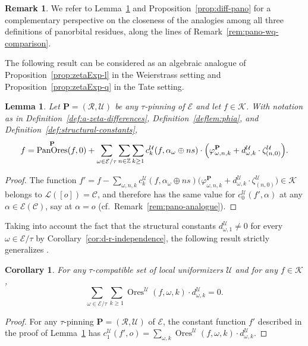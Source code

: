 \documentclass[preprint,12pt]{elsarticle}
\numberwithin{equation}{section} %
\theoremstyle{theorem}
\newtheorem{lemma}[theorem]{Lemma}
\newtheorem{corollary}[theorem]{Corollary}
\theoremstyle{definition}
\newtheorem{remark}[theorem]{Remark}
\newcommand{\Ca}{\mathcal{C}} %
\newcommand{\bk}{\mathcal{K}} %
\newcommand{\ec}{\mathcal{E}} %
\newcommand{\idec}{{o}} %
\newcommand{\orbita}{{\ec/\tau}} %
\newcommand{\Z}{\mathbb{Z}} %
\newcommand{\za}[2]{\zeta^{\mathcal{U}}_{( {#1} , {#2} )}}
\DeclareMathOperator{\ores}{Ores}
\DeclareMathOperator{\pano}{PanOres}
\begin{document}
\begin{remark}
    We refer to Lemma~\ref{lem:zetaExp-a} and Proposition~\ref{prop:diff-pano} for a complementary perspective on the closeness of the analogies among all three definitions of panorbital residues, along the lines of Remark~\ref{rem:pano-wq-comparison}.
\end{remark}


The following result can be considered as an algebraic analogue of Proposition~\ref{prop:zetaExp-l} in the Weierstrass setting and Proposition~\ref{prop:zetaExp-q} in the Tate setting.

\begin{lemma}\label{lem:zetaExp-a}
    Let $\mathbf{P}=(\mathcal{R},\mathcal{U})$ be any $\tau$-pinning of $\mathcal{E}$ and let $f\in\bk$. With notation as in Definition~\ref{def:a-zeta-differences},  Definition~\ref{deflem:phia}, and Definition~\ref{def:structural-constants},
    \begin{equation}\label{eq:zetaExp-a}
    f=\pano^\mathbf{P}(f,0)+\sum_{\omega\in\orbita}\sum_{n\in\Z}\sum_{k\geq 1}c^\mathcal{U}_k(f,\alpha_\omega\oplus ns)\cdot\Bigl(\varphi^\mathbf{P}_{\omega,n,k}+d^\mathcal{U}_{\omega,k}\cdot\za{n}{0}\Bigr).
    \end{equation}
\end{lemma}

\begin{proof}
The function $f'=f-\sum_{\omega,n,k}c^\mathcal{U}_k(f,\alpha_\omega\oplus ns)\bigl(\varphi^\mathbf{P}_{\omega,n,k}+d^\mathcal{U}_{\omega,k}\cdot\za{n}{0}\bigr)\in\bk$ belongs to $\mathcal{L}([\idec])=\Ca$, and therefore has the same value for $c_0^\mathcal{U}(f',\alpha)$ at any $\alpha\in\ec(\Ca)$, say at $\alpha=\idec$ (cf.~Remark~\ref{rem:pano-analogue}).
\end{proof}

Taking into account the fact that the structural constants $d_{\omega,1}^\mathcal{U}\neq 0$ for every $\omega\in\orbita$ by Corollary~\ref{cor:d-r-independence}, the following result strictly generalizes \cite[Lem.~B.15]{Dreyfus2018}.

\begin{corollary} \label{cor:zetaExp-a}For any $\tau$-compatible set of local uniformizers $\mathcal{U}$ and for any $f\in\bk$, \[\sum_{\omega\in\orbita}\sum_{k\geq 1}\ores^\mathcal{U}(f,\omega,k)\cdot d^\mathcal{U}_{\omega,k}=0.\]
\end{corollary}
\begin{proof}
    For any $\tau$-pinning $\mathbf{P}=(\mathcal{R},\mathcal{U})$ of $\ec$, the constant function $f'$ described in the proof of Lemma~\ref{lem:zetaExp-a} has $c_1^\mathcal{U}(f',\idec)=\sum_{\omega,k}\ores^\mathcal{U}(f,\omega,k)\cdot d^\mathcal{U}_{\omega,k}$.
\end{proof}
\end{document}
